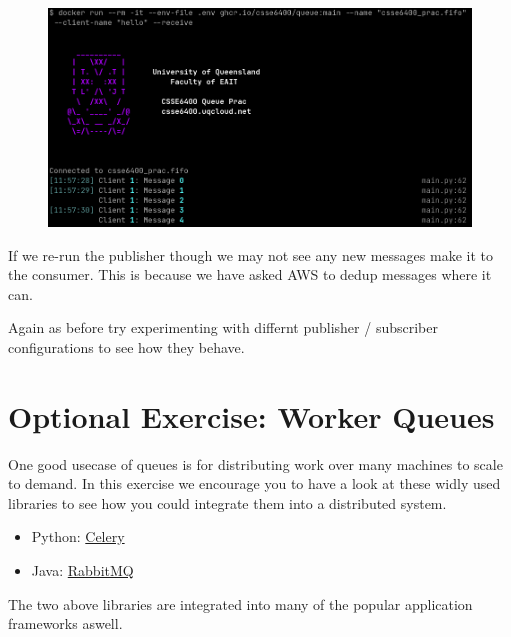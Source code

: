 \documentclass{csse4400}
\begin{document}
\begin{figure}[H]
  \includegraphics[width=\textwidth]{images/fifosub}
\end{figure}

If we re-run the publisher though we may not see any new messages make it to the consumer. This is because we have asked AWS to dedup messages where it can.


Again as before try experimenting with differnt publisher / subscriber configurations to see how they behave.




\section{Optional Exercise: Worker Queues}

One good usecase of queues is for distributing work over many machines to scale to demand. In this exercise we encourage you to have a look at these widly used libraries to see how you could integrate them into a distributed system.

\begin{itemize}
  \item Python: \href{https://docs.celeryq.dev/en/stable/}{Celery}
  \item Java: \href{https://www.rabbitmq.com/tutorials/tutorial-one-java.html}{RabbitMQ}
\end{itemize}

The two above libraries are integrated into many of the popular application frameworks aswell.



\end{document}
